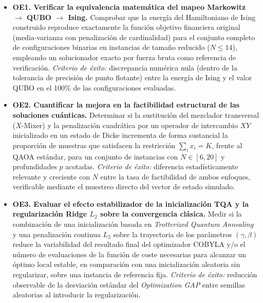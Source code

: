 \begin{itemize}

    \item \textbf{OE1. Verificar la equivalencia matemática del mapeo
    Markowitz $\rightarrow$ QUBO $\rightarrow$ Ising.}
    Comprobar que la energía del Hamiltoniano de Ising construido reproduce
    exactamente la función objetivo financiera original (media-varianza con
    penalización de cardinalidad) para el conjunto completo de
    configuraciones binarias en instancias de tamaño reducido ($N \le 14$),
    empleando un solucionador exacto por fuerza bruta como referencia de
    verificación. \textit{Criterio de éxito:} discrepancia numérica nula
    (dentro de la tolerancia de precisión de punto flotante) entre la energía
    de Ising y el valor QUBO en el 100\% de las configuraciones evaluadas.

    \item \textbf{OE2. Cuantificar la mejora en la factibilidad estructural
    de las soluciones cuánticas.}
    Determinar si la sustitución del mezclador transversal ($X$-Mixer) y la
    penalización cuadrática por un operador de intercambio $XY$ inicializado
    en un estado de Dicke incrementa de forma sustancial la proporción de
    muestras que satisfacen la restricción $\sum_i x_i = K$, frente al QAOA
    estándar, para un conjunto de instancias con $N \in [6, 20]$ y
    profundidades $p$ acotadas. \textit{Criterio de éxito:} diferencia
    estadísticamente relevante y creciente con $N$ entre la tasa de
    factibilidad de ambos enfoques, verificable mediante el muestreo directo
    del vector de estado simulado.

    \item \textbf{OE3. Evaluar el efecto estabilizador de la inicialización
    TQA y la regularización Ridge $L_2$ sobre la convergencia clásica.}
    Medir si la combinación de una inicialización basada en \textit{Trotterized
    Quantum Annealing} y una penalización continua $L_2$ sobre la
    trayectoria de los parámetros $(\gamma, \beta)$ reduce la variabilidad
    del resultado final del optimizador COBYLA y/o el número de evaluaciones
    de la función de coste necesarias para alcanzar un óptimo local estable,
    en comparación con una inicialización aleatoria sin regularizar, sobre
    una instancia de referencia fija. \textit{Criterio de éxito:} reducción
    observable de la desviación estándar del \textit{Optimization GAP} entre
    semillas aleatorias al introducir la regularización.


\end{itemize}
